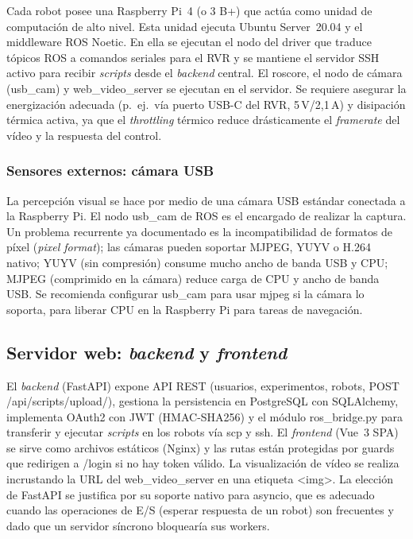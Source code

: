 \documentclass[12pt]{article}
\numberwithin{figure}{section}
\numberwithin{table}{section}
\def\code#1{#1}%
\def\file#1{#1}%
\newcommand{\code}[1]{\textcolor{codeblue}{\url{#1}}}
\newcommand{\file}[1]{\textcolor{darkblue}{\url{#1}}}
\begin{document}
Cada robot posee una Raspberry Pi~4 (o 3 B+) que actúa como unidad de computación de alto nivel. Esta unidad ejecuta Ubuntu Server~20.04 y el middleware ROS Noetic. En ella se ejecutan el nodo del driver que traduce tópicos ROS a comandos seriales para el RVR y se mantiene el servidor SSH activo para recibir \textit{scripts} desde el \textit{backend} central. El \code{roscore}, el nodo de cámara (\code{usb\_cam}) y \code{web\_video\_server} se ejecutan en el servidor. Se requiere asegurar la energización adecuada (p.\ ej.\ vía puerto USB-C del RVR, 5\,V/2,1\,A) y disipación térmica activa, ya que el \emph{throttling} térmico reduce drásticamente el \textit{framerate} del vídeo y la respuesta del control.


\subsubsection{Sensores externos: cámara USB}

La percepción visual se hace por medio de una cámara USB estándar conectada a la Raspberry Pi. El nodo \code{usb\_cam} de ROS es el encargado de realizar la captura. Un problema recurrente ya documentado es la incompatibilidad de formatos de píxel (\emph{pixel format}); las cámaras pueden soportar MJPEG, YUYV o H.264 nativo; YUYV (sin compresión) consume mucho ancho de banda USB y CPU; MJPEG (comprimido en la cámara) reduce carga de CPU y ancho de banda USB. Se recomienda configurar \code{usb\_cam} para usar \code{mjpeg} si la cámara lo soporta, para liberar CPU en la Raspberry Pi para tareas de navegación.


\subsection{Servidor web: \textit{backend} y \textit{frontend}}

El \textit{backend} (FastAPI) expone API REST (usuarios, experimentos, robots, \code{POST /api/scripts/upload/}), gestiona la persistencia en PostgreSQL con SQLAlchemy, implementa OAuth2 con JWT (HMAC-SHA256) y el módulo \file{ros\_bridge.py} para transferir y ejecutar \textit{scripts} en los robots vía \code{scp} y \code{ssh}. El \textit{frontend} (Vue~3 SPA) se sirve como archivos estáticos (Nginx) y las rutas están protegidas por guards que redirigen a \code{/login} si no hay token válido. La visualización de vídeo se realiza incrustando la URL del \code{web\_video\_server} en una etiqueta \code{<img>}. La elección de FastAPI se justifica por su soporte nativo para asyncio, que es adecuado cuando las operaciones de E/S (esperar respuesta de un robot) son frecuentes y dado que un servidor síncrono bloquearía sus workers.
\end{document}
